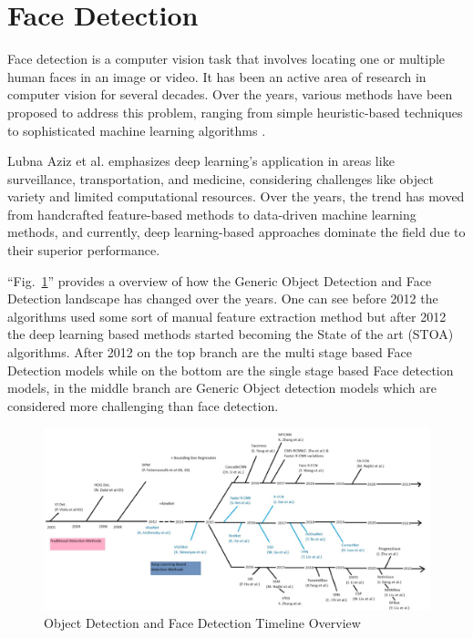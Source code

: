 \section{Face Detection} \label{section:fd}
Face detection is a computer vision task that involves locating one or multiple human faces in an image or video. It has been an active area of research in computer vision for several decades. Over the years, various methods have been proposed to address this problem, ranging from simple heuristic-based techniques to sophisticated machine learning algorithms \cite{feng_detect_2022}.

Lubna Aziz et al. \cite{aziz_exploring_2020} emphasizes deep learning's application in areas like surveillance, transportation, and medicine, considering challenges like object variety and limited computational resources. Over the years, the trend has moved from handcrafted feature-based methods to data-driven machine learning methods, and currently, deep learning-based approaches dominate the field due to their superior performance.

``Fig.~\ref{od-timeline}'' provides a overview of how the Generic Object Detection and Face Detection landscape has changed over the years. One can see before 2012 the algorithms used some sort of manual feature extraction method but after 2012 the deep learning based methods started becoming the State of the art (STOA) algorithms. After 2012 on the top branch are the multi stage based Face Detection models while on the bottom are the single stage based Face detection models, in the middle branch are Generic Object detection models which are considered more challenging than face detection.

\begin{figure}[htbp]
\centerline{\includegraphics[width=\columnwidth]{assets/od-timeline.jpg}}
\caption{Object Detection and Face Detection Timeline Overview}
\label{od-timeline}
\end{figure}

